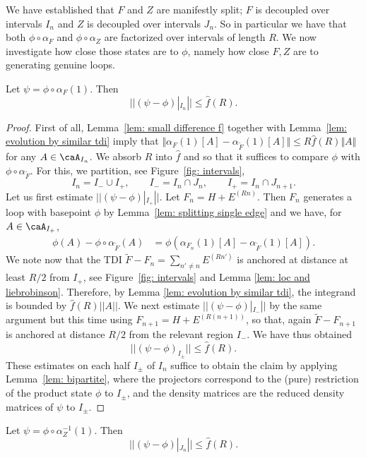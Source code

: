 We have established that $F$ and $Z$  are manifestly split;  $F$ is decoupled over intervals $I_n$ and $Z$ is decoupled over intervals $J_n$. 
So in particular we have that both $\phi \circ \alpha_{F}$ and $\phi \circ \alpha_{Z}$ are factorized over intervals of length $R$.  
We now investigate how close those states are to $\phi$, namely how close $F, Z$ are to generating genuine loops.  
%
%
%
\begin{lemma}\label{lem: almost loop f}
	Let $\psi=\phi \circ \alpha_{F}(1)$. Then
	$$||(\psi  - \phi)|_{{I_n}}|| \leq \hat{f}(R).$$
\end{lemma}
\begin{proof}
	First of all, Lemma~\ref{lem: small difference f} together with Lemma~\ref{lem: evolution by similar tdi} imply that $\Vert \alpha_{F}(1)[A]- \alpha_{\widetilde F}(1)[A]\Vert \leq  R \hat f(R)\Vert A\Vert$ for any $A\in\caA_{I_n}$. We absorb $R$ into $\hat f$ and so that it suffices to compare $\phi$ with $\phi\circ\alpha_{\widetilde F}$. For this, we  partition, see Figure~\ref{fig: intervals},  
	$$I_n= I_- \cup I_+, \qquad  I_-=I_n \cap J_{n}, \qquad I_+=I_n \cap J_{n+1}.$$
	Let us first estimate $||(\psi-\phi)|_{I_{+}}||$.
	Let $F_n=H+E^{(Rn)}$. Then $F_n$ generates a loop with basepoint $\phi$ by Lemma~\ref{lem: splitting single edge} and we have, for $A\in \caA_{I_+}$,
	\begin{align}
	\phi(A)-\phi\circ\alpha_{\widetilde F}(A)& = \phi(\alpha_{F_n}(1)[A]- \alpha_{\widetilde F}(1)[A] ).
	\end{align}
	We note now that the TDI $\widetilde F-F_n=\sum_{n'\neq n } E^{(Rn')}$ is anchored at distance at least $R/2$ from $I_+$, see Figure~\ref{fig: intervals} and Lemma \ref{lem: loc and liebrobinson}.  Therefore, by Lemma \ref{lem: evolution by similar tdi},  the integrand is bounded by  $\hat{f}(R) ||A ||$.
	We next estimate $||(\psi-\phi)|_{I_{-}}||$ by the same argument but this time using $F_{n+1}=H+E^{(R(n+1))}$, so that, again $\widetilde F-F_{n+1}$ is anchored at distance $R/2$ from the relevant region $I_-$.  We have thus obtained 
	$$
	||(\psi-\phi)_{I_{\pm}}||  \leq \hat{f}(R).
	$$
	These estimates on each half $I_\pm$ of $I_n$ suffice to obtain the claim by applying Lemma~\ref{lem: bipartite}, where the projectors correspond to the (pure) restriction of the product state $\phi$ to $I_\pm$, and the density matrices are the reduced density matrices of $\psi$ to $I_\pm$.
\end{proof}
%
%
%
\begin{lemma}\label{lem: almost loop k}
	Let $\psi=\phi \circ \alpha_{Z}^{-1}(1)$. Then
	$$||(\psi  -\phi)|_{J_n}|| \leq \hat{f}(R).$$
\end{lemma}
